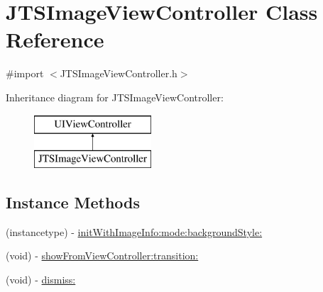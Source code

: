 \hypertarget{interface_j_t_s_image_view_controller}{}\section{J\+T\+S\+Image\+View\+Controller Class Reference}
\label{interface_j_t_s_image_view_controller}


{\ttfamily \#import $<$J\+T\+S\+Image\+View\+Controller.\+h$>$}

Inheritance diagram for J\+T\+S\+Image\+View\+Controller\+:\begin{figure}[H]
\begin{center}
\leavevmode
\includegraphics[height=2.000000cm]{interface_j_t_s_image_view_controller}
\end{center}
\end{figure}
\subsection*{Instance Methods}
\begin{DoxyCompactItemize}
\item 
(instancetype) -\/ \hyperlink{interface_j_t_s_image_view_controller_ab604d3b2d2cf17b374d3d0fe7fc01528}{init\+With\+Image\+Info\+:mode\+:background\+Style\+:}
\item 
(void) -\/ \hyperlink{interface_j_t_s_image_view_controller_adf9f194c030c0e4ca00f8cdde2971219}{show\+From\+View\+Controller\+:transition\+:}
\item 
(void) -\/ \hyperlink{interface_j_t_s_image_view_controller_a5ce390054438f3c6aa25e2c34ccc37be}{dismiss\+:}
\end{DoxyCompactItemize}

